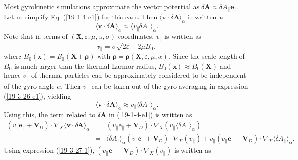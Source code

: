 \documentclass{article}
\newcommand{\tmmathbf}[1]{\ensuremath{\boldsymbol{#1}}}
\begin{document}
Most gyrokinetic simulations approximate the vector potential as $\delta
\mathbf{A} \approx \delta A_{\parallel} \mathbf{e}_{\parallel}$. Let us
simplify Eq. (\ref{19-1-4-e1}) for this case. Then $\langle \mathbf{v} \cdot
\delta \mathbf{A} \rangle_{\alpha}$ is written as
\begin{equation}
  \label{19-3-26-e1} \langle \mathbf{v} \cdot \delta \mathbf{A}
  \rangle_{\alpha} \approx \langle v_{\parallel} \delta A_{\parallel}
  \rangle_{\alpha} .
\end{equation}
Note that in terms of $(\mathbf{X}, \varepsilon, \mu, \alpha, \sigma)$
coordinates, $v_{\parallel}$ is written as
\begin{equation}
  \label{19-3-27-1} v_{\parallel} = \sigma \sqrt{2 \varepsilon - 2 \mu B_0},
\end{equation}
where $B_0 (\mathbf{x}) = B_0 (\mathbf{X}+\tmmathbf{\rho})$ with
$\tmmathbf{\rho}=\tmmathbf{\rho} (\mathbf{X}, \varepsilon, \mu, \alpha)$.
Since the scale length of $B_0$ is much larger than the thermal Larmor radius,
$B_0 (\mathbf{x}) \approx B_0 (\mathbf{X})$ and hence $v_{\parallel}$ of
thermal particles can be approximately considered to be independent of the
gyro-angle $\alpha$. Then $v_{\parallel}$ can be taken out of the
gyro-averaging in expression (\ref{19-3-26-e1}), yielding
\begin{equation}
  \langle \mathbf{v} \cdot \delta \mathbf{A} \rangle_{\alpha} \approx
  v_{\parallel} \langle \delta A_{\parallel} \rangle_{\alpha} .
\end{equation}
Using this, the term related to $\delta \mathbf{A}$ in (\ref{19-1-4-e1}) is
written as
\begin{eqnarray}
  (v_{\parallel} \mathbf{e}_{\parallel} +\mathbf{V}_D) \cdot \nabla_X \langle
  \mathbf{v} \cdot \delta \mathbf{A} \rangle_{\alpha} & = & (v_{\parallel}
  \mathbf{e}_{\parallel} +\mathbf{V}_D) \cdot \nabla_X (v_{\parallel} \langle
  \delta A_{\parallel} \rangle_{\alpha}) \nonumber\\
  & = & \langle \delta A_{\parallel} \rangle_{\alpha} (v_{\parallel}
  \mathbf{e}_{\parallel} +\mathbf{V}_D) \cdot \nabla_X (v_{\parallel}) +
  v_{\parallel} (v_{\parallel} \mathbf{e}_{\parallel} +\mathbf{V}_D) \cdot
  \nabla_X \langle \delta A_{\parallel} \rangle_{\alpha} . 
\end{eqnarray}
Using expression (\ref{19-3-27-1}), $(v_{\parallel} \mathbf{e}_{\parallel}
+\mathbf{V}_D) \cdot \nabla_X (v_{\parallel})$ is written as
\end{document}
